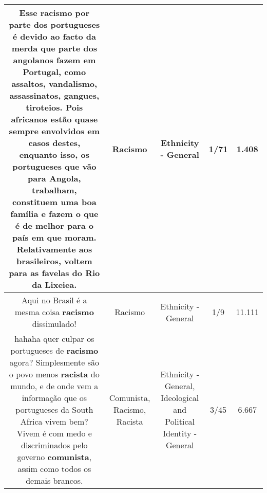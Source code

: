 \documentclass[11pt]{article}
\newlength\mylength
\begin{document}
\begin{center}
\begin{longtable}{|C{.65\mylength}|C{.30\mylength}|C{.12\mylength}|C{.12\mylength}|C{.12\mylength}|}
  \small Esse \textbf{racismo} por parte dos portugueses é devido ao facto da merda que parte dos angolanos fazem em Portugal, como assaltos, vandalismo, assassinatos, gangues, tiroteios. Pois africanos estão quase sempre envolvidos em casos destes, enquanto isso, os portugueses que vão para Angola, trabalham, constituem uma boa família e fazem o que é de melhor para o país em que moram. Relativamente aos brasileiros, voltem para as favelas do Rio da Lixeiea.\normalsize   & Racismo & Ethnicity - General & 1/71 & 1.408 \\  \hline
  \small Aqui no Brasil é a mesma coisa \textbf{racismo} dissimulado!\normalsize   & Racismo & Ethnicity - General & 1/9 & 11.111 \\  \hline
  \small hahaha quer culpar os portugueses de \textbf{racismo} agora? Simplesmente são o povo menos \textbf{racista} do mundo, e de onde vem a informação que os portugueses da South Africa vivem bem? Vivem é com medo e discriminados pelo governo \textbf{comunista}, assim como todos os demais brancos.\normalsize   & Comunista, Racismo, Racista & Ethnicity - General, Ideological and Political Identity - General & 3/45 & 6.667 \\  \hline

\end{longtable}
\end{center}
\end{document}
